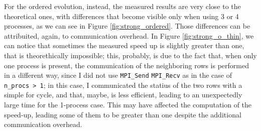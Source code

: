 \documentclass[12pt]{article}
\begin{document}
    For the ordered evolution, instead, the measured results are very close to the theoretical ones, with differences that become visible only when using 3 or 4 processes, as we can see in Figure \ref{fig:strong_ordered}. Those differences can be attribuited, again, to communication overhead.\newline
    In Figure \ref{fig:strong_o_thin}, we can notice that sometimes the measured speed up is slightly greater than one, that is theorethically impossible; this, probably, is due to the fact that, when only one process is present, the communication of the neighboring rows is performed in a different way, since I did not use \lstinline|MPI_Send| \lstinline|MPI_Recv| as in the case of \lstinline|n_procs > 1|; in this case, I communicated the statius of the two rows with a simple for cycle, and that, maybe, is less efficient, leading to an unexpectedly large time for the 1-process case. This may have affected the computation of the speed-up, leading some of them to be greater than one despite the additional communication overhead.\newline
    
\end{document}
